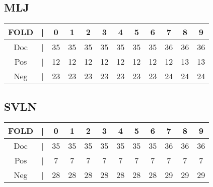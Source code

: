 \subsection{MLJ}
\begin{table}[htbp]
	\centering
		\begin{tabular}{cccccccccccc}
			FOLD & | &  0 &  1 &  2 &  3 &  4 &  5 &  6 &  7 &  8 &  9 \\ \hline
			Doc  & | & 35 & 35 & 35 & 35 & 35 & 35 & 35 & 36 & 36 & 36 \\
			Pos  & | & 12  & 12  &  12 &  12 &  12 &  12 &  12 &  12 &  13 &  13 \\
			Neg  & | & 23 & 23 & 23 & 23 & 23 & 23 & 23 & 24 & 24 & 24 \\
		\end{tabular}%
	
	\label{tab:MLJ}
\end{table}
\subsection{SVLN}
\begin{table}[htbp]
	\centering
		\begin{tabular}{cccccccccccc}
			FOLD &| &  0 &  1 &  2 &  3 &  4 &  5 &  6 &  7 &  8 &  9 \\\hline
			Doc  &| & 35 & 35 & 35 & 35 & 35 & 35 & 35 & 36 & 36 & 36 \\
			Pos  &| & 7  & 7  &  7 &  7 &  7 &  7 &  7 &  7 &  7 &  7 \\
			Neg  &| & 28 & 28 & 28 & 28 & 28 & 28 & 28 & 29 & 29 & 29 \\
		\end{tabular}%
	\label{tab:SVLN}
\end{table}
